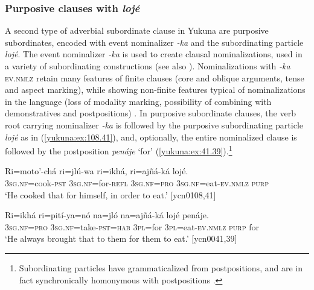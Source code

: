\documentclass[output=paper,colorlinks,citecolor=brown]{langscibook}
\begin{document}
\subsubsection{Purposive clauses with \textit{lojé}}\label{yukuna:purp.loje}

A second type of adverbial subordinate clause in Yukuna are purposive subordinates, encoded with event nominalizer \textit{-ka} and the subordinating particle \textit{lojé}. The event nominalizer \textit{-ka} is used to create clausal nominalizations, used in a variety of subordinating constructions (see also ). Nominalizations with \textit{-ka} \textsc{ev.nmlz} retain many features of finite clauses (core and oblique arguments, tense and aspect marking), while showing non-finite features typical of nominalizations in the language (loss of modality marking, possibility of combining with demonstratives and postpositions) \citep[242--243]{Lemus2020}. In purposive subordinate clauses, the verb root carrying nominalizer \textit{-ka} is followed by the purposive subordinating particle \textit{lojé} as in (\ref{yukuna:ex:108.41}), and, optionally, the entire nominalized clause is followed by the postposition \textit{penáje} `for’ (\ref{yukuna:ex:41.39}).\footnote{Subordinating particles have grammaticalized from postpositions, and are in fact synchronically homonymous with postpositions \citep[306--309]{Lemus2020}.} 

\ea\label{yukuna:ex:108.41}
\gll Ri=moto'-chá ri=jlú-wa ri=ikhá, ri=ajñá-ká lojé.\\
\textsc{3sg.nf}=cook-\textsc{pst} \textsc{3sg.nf}=for-\textsc{refl} \textsc{3sg.nf}=\textsc{pro} \textsc{3sg.nf}=eat-\textsc{ev.nmlz}  \textsc{purp}  \\
\glt ‘He cooked that for himself, in order to eat.’ [ycn0108,41]
\z

\ea\label{yukuna:ex:41.39}
\gll Ri=ikhá ri=pití-ya=nó na=jló na=ajñá-ká lojé penáje.\\
\textsc{3sg.nf}=\textsc{pro} \textsc{3sg.nf}=take-\textsc{pst}=\textsc{hab} \textsc{3pl}=for  \textsc{3pl}=eat-\textsc{ev.nmlz}  \textsc{purp} for  \\
\glt ‘He always brought that to them for them to eat.’ [ycn0041,39]
\z
\end{document}

